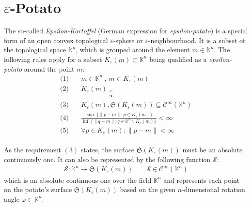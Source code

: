 \documentclass[pdftex,12pt,a4paper]{report}
\newcommand{\sfa}{_{\substack{ < \\ \infty }}}
\begin{document}
    \section{$ \varepsilon $-Potato}
    The so-called \emph{Epsilon-Kartoffel} (German expression for \emph{epsilon-potato}) is a special form of an open convex topological $\varepsilon$-sphere or $\varepsilon$-neighbourhood. It is a subset of the topological space $ \mathbb{K}^n $, which is grouped around the element $ m \in \mathbb{K}^n $. The following rules apply for a subset $ K_{\varepsilon}(m) \subset \mathbb{K}^n $ being qualified as a \emph{epsilon-potato} around the point $ m $:
    \\
    \begin{equation*}
        \begin{aligned}
            \text{(1)} \quad & m \in \mathbb{K}^n \ , \ m \in K_{\varepsilon}(m)
            \\
            \text{(2)} \quad & {K_{\varepsilon}(m)}\sfa
            \\
            \text{(3)} \quad & K_{\varepsilon}(m), \mathfrak{S}(K_{\varepsilon}(m)) \subseteq \mathcal{C}^\infty (\mathbb{K}^n)
            \\
            \text{(4)} \quad & \frac{\sup \ \{\|p-m\| : p \in K_{\varepsilon}(m)\}}{\inf \ \{\|q-m\| : q \in \mathbb{K}^n \backslash K_{\varepsilon}(m)\}} < \infty
            \\
            \text{(5)} \quad & \forall p \in K_{\varepsilon}(m) : \|p-m\| < \infty
        \end{aligned}
    \end{equation*}
    \\
    As the requirement $ (3) $ states, the surface $ \mathfrak{S}(K_{\varepsilon}(m)) $ must be an absolute continuously one. It can also be represented by the following function $ \mathcal{S} $:
    \begin{equation*}
        \begin{aligned}
            \mathcal{S} : \mathbb{K}^n \rightarrow \mathfrak{S}(K_{\varepsilon}(m)) \qquad \mathcal{S} \in \mathcal{C}^\infty (\mathbb{K}^n)
        \end{aligned}
    \end{equation*}
    which is an absolute continuous one over the field $ \mathbb{K}^n $ and represents each point on the potato's surface $ \mathfrak{S}(K_{\varepsilon}(m)) $ based on the given $ n $-dimensional rotation angle $ \varphi \in \mathbb{K}^n $.
\end{document}
